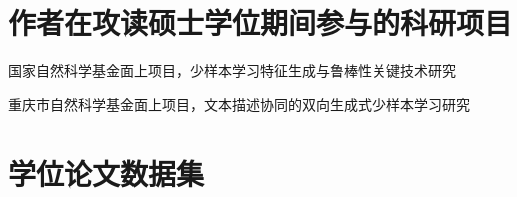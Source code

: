\section[\hspace{-2pt}作者在攻读硕士学位期间参与的科研项目]{{\heiti{} \hspace{-8pt}作者在攻读硕士学位期间参与的科研项目}}

 {
  \small
  \setlength{\baselineskip}{20pt}
  \begin{enumerate}[label={[\arabic*]}, leftmargin=*]
    \item 国家自然科学基金面上项目，少样本学习特征生成与鲁棒性关键技术研究
    \item 重庆市自然科学基金面上项目，文本描述协同的双向生成式少样本学习研究
  \end{enumerate}
 }

\newpage
\section[\hspace{-2pt}学位论文数据集]{{\heiti{} \hspace{-8pt}学位论文数据集}}

